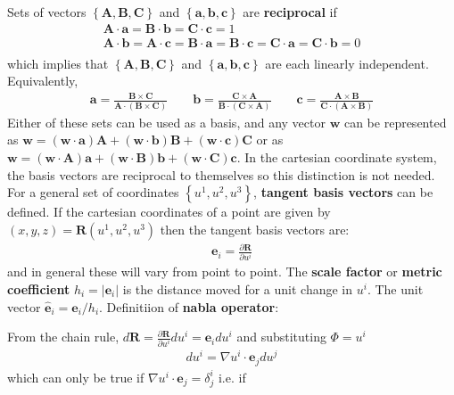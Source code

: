 \documentclass[12pt]{article}
\def\L{\left}
\def\R{\right}
\newcommand{\ve}[1]{\ensuremath{\boldsymbol{#1}}}
\newcommand{\hv}[1]{\hat{\ve{#1}}}
\newcommand{\bvec}{\ve{b}}
\newcommand{\Bvec}{\ve{B}}
\begin{document}
Sets of vectors $\L\{\mathbf{A, B, C}\R\}$ and $\L\{\mathbf{a, b, c}\R\}$ are
{\bf reciprocal} if
%
\begin{align*}
\mathbf{A\cdot a} = \mathbf{B\cdot b} = \mathbf{C\cdot c} = 1\\ \mathbf{A\cdot
b} = \mathbf{A\cdot c} = \mathbf{B\cdot a} = \mathbf{B\cdot c} = \mathbf{C\cdot
a} = \mathbf{C\cdot b} = 0 \\
\end{align*}
%
which implies that $\L\{\mathbf{A, B, C}\R\}$ and $\L\{\mathbf{a, b, c}\R\}$
are each linearly independent.  Equivalently,
%
\begin{align*}
\mathbf{a} = \frac{\mathbf{B\times C}}{\mathbf{A\cdot\L(B\times C\R)}}\qquad
\bvec = \frac{\mathbf{C\times A}}{\mathbf{B\cdot\L(C\times A\R)}}\qquad
\mathbf{c} = \frac{\mathbf{A\times B}}{\mathbf{C\cdot\L(A\times B\R)}}
\end{align*}
%
Either of these sets can be used as a basis, and any vector $\mathbf{w}$ can be
represented as $\mathbf{w} = \L(\mathbf{w\cdot a}\R)\mathbf{A} +
\L(\mathbf{w\cdot b}\R)\Bvec + \L(\mathbf{w\cdot c}\R)\mathbf{C}$ or as
$\mathbf{w} = \L(\mathbf{w\cdot A}\R)\mathbf{a} + \L(\mathbf{w\cdot B}\R)\bvec
+ \L(\mathbf{w\cdot C}\R)\mathbf{c}$. In the cartesian coordinate system, the
basis vectors are reciprocal to themselves so this distinction is not needed.
For a general set of coordinates $\L\{u^1, u^2, u^3\R\}$, {\bf tangent basis
vectors} can be defined. If the cartesian coordinates of a point are given by
$\L(x, y, z\R) = \mathbf{R}\L(u^1, u^2, u^3\R)$ then the tangent basis vectors
are:
%
\begin{align*}
\ve{e}_i = \frac{\partial\mathbf{R}}{\partial u^i}
\end{align*}
%
and in general these will vary from point to point. The {\bf scale factor} or
{\bf metric coefficient} $h_i =\L|\ve{e}_i\R| $ is the distance moved for a
unit change in $u^i$. The unit vector $\hv{e}_i = \ve{e}_i/h_i$.  Definitiion
of {\bf nabla operator}:
%
\begin{center}
\end{center}
%
From the chain rule, $d\mathbf{R} = \frac{\partial\mathbf{R}}{\partial u^i}du^i
= \ve{e}_idu^i$ and substituting $\Phi = u^i$
%
\begin{align*}
du^i = \nabla u^i\cdot\ve{e}_jdu^j
\end{align*}
%
which can only be true if $\nabla u^i\cdot\ve{e}_j = \delta^i_j$ i.e. if
\end{document}
